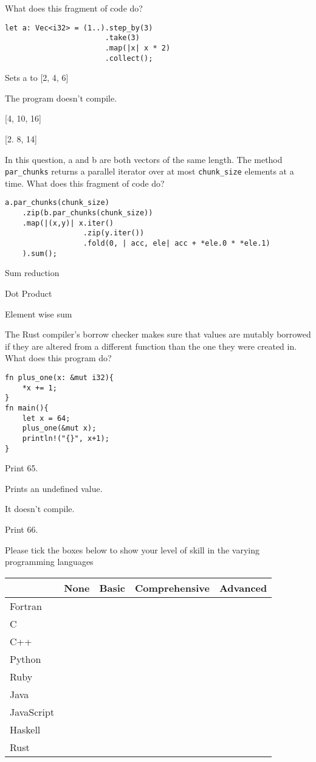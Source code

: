 \documentclass[11pt]{article} %
\newcommand*\choice{\item}
\begin{document}
\begin{multiplechoice}[choices=1]
What does this fragment of code do?

\begin{lstlisting}
let a: Vec<i32> = (1..).step_by(3)
                       .take(3)
                       .map(|x| x * 2)
                       .collect();
\end{lstlisting}

  \choice Sets a to {[2, 4, 6]}
  \choice The program doesn't compile.
  \choice {[4, 10, 16]}
  \choice {[2. 8, 14]}
\end{multiplechoice}

\begin{multiplechoice}[choices=1]
In this question, a and b are both vectors of the same length. The method \texttt{par\_chunks} returns a parallel iterator over at most \texttt{chunk\_size} elements at a time. What does this fragment of code do?
\begin{lstlisting}
a.par_chunks(chunk_size)
    .zip(b.par_chunks(chunk_size))
    .map(|(x,y)| x.iter()
                  .zip(y.iter())
                  .fold(0, | acc, ele| acc + *ele.0 * *ele.1)
    ).sum();

\end{lstlisting}

\choice Sum reduction
\choice Dot Product
\choice Element wise sum


\end{multiplechoice}
\begin{multiplechoice}[choices=1]
The Rust compiler's borrow checker makes sure that values are mutably borrowed if they are altered from a different function than the one they were created in. What does this program do?
\begin{lstlisting}
fn plus_one(x: &mut i32){
    *x += 1;
}
fn main(){
    let x = 64;
    plus_one(&mut x);
    println!("{}", x+1);
}
\end{lstlisting}
  \choice Print 65.
  \choice Prints an undefined value.
  \choice It doesn't compile.
  \choice Print 66.
\end{multiplechoice}
\pagebreak
\begin{exercise}
Please tick the boxes below to show your level of skill in the varying programming languages
\begin{center}
\begin{tabular}{|l|c|c|c|c|}
\hline
& None & Basic & Comprehensive & Advanced \\ \hline
Fortran & & & & \\ \hline
C & & & & \\ \hline
C++ & & & & \\ \hline
Python & & & & \\ \hline
Ruby & & & & \\ \hline
Java & & & & \\ \hline
JavaScript & & & & \\ \hline
Haskell & & & & \\ \hline
Rust  & & & & \\ \hline
\end{tabular}
\end{center}

\end{exercise}
\end{document}
